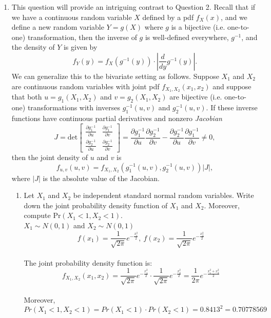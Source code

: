 \documentclass[11pt]{article}
\newcommand{\pr}{\text{Pr}}
\begin{document}
\begin{enumerate}[label=\textbf{Question \arabic*:},start=1]
\begin{enumerate}
\end{enumerate}






\item 
This question will provide an intriguing contrast to Question 2. Recall that if we have a continuous random variable $X$ defined by a pdf $f_X(x)$, and we define a new random variable $Y = g(X)$ where $g$ is a bijective (i.e. one-to-one) transformation, then the inverse of $g$ is well-defined everywhere, $g^{-1}$, and the density of $Y$ is given by $$f_Y(y) = f_X(g^{-1}(y))\cdot \left| \frac d{dy} g^{-1}(y)\right|.$$ We can generalize this to the bivariate setting as follows. Suppose $X_1$ and $X_2$ are continuous random variables with joint pdf $f_{X_1,X_2}(x_1,x_2)$ and suppose that both $u = g_1(X_1,X_2)$ and $v = g_2(X_1,X_2)$ are bijective (i.e. one-to-one) transformations with inverses $g_1^{-1}(u,v)$ and $g_2^{-1}(u,v)$. If these inverse functions have continuous partial derivatives and nonzero {\em Jacobian} 
\[
J = \text{det}
\begin{bmatrix}
	\frac {\partial g_1^{-1}}{\partial u}	& \frac {\partial g_1^{-1}}{\partial v} \\
	\frac {\partial g_2^{-1}}{\partial u}	& \frac {\partial g_2^{-1}}{\partial v}
\end{bmatrix}
= \frac {\partial g_1^{-1}}{\partial u} \frac {\partial g_2^{-1}}{\partial v} - \frac {\partial g_2^{-1}}{\partial u} \frac {\partial g_1^{-1}}{\partial v} \neq 0,
\]
then the joint density of $u$ and $v$ is $$f_{u,v}(u,v) = f_{X_1,X_2}\left( g_1^{-1}(u,v), g_2^{-1}(u,v)\right) |J|,$$ where $|J|$ is the absolute value of the Jacobian.

\begin{enumerate}
  \item Let $X_1$ and $X_2$ be independent standard normal random variables. Write down the joint probability density function of $X_1$ and $X_2$. Moreover, compute $\pr(X_1<1,X_2<1)$.\\
  
  $X_1 \sim N(0, 1)$ and $X_2 \sim N(0, 1)$\\
  $$f(x_1) = \frac{1}{\sqrt{2 \pi}} e^{-\frac{x_1^2}{2}}, \ f(x_2) = \frac{1}{\sqrt{2 \pi}} e^{-\frac{x_2^2}{2}}  $$ \\
  The joint probability density function is: \\
  $$f_{X_1, X_2}(x_1, x_2) = \frac{1}{\sqrt{2 \pi}} e^{-\frac{x_1^2}{2}} \cdot  \frac{1}{\sqrt{2 \pi}} e^{-\frac{x_2^2}{2}} = \frac{1}{2 \pi} e^{-\frac{x_1^2 + x_2^2}{2}}$$\\
  Moreover, $Pr(X_1 < 1, X_2 < 1) = Pr(X_1 < 1) \cdot Pr(X_2 < 1) = 0.8413^2 = 0.70778569 $\\


\end{enumerate}
\end{enumerate}
\end{document}
